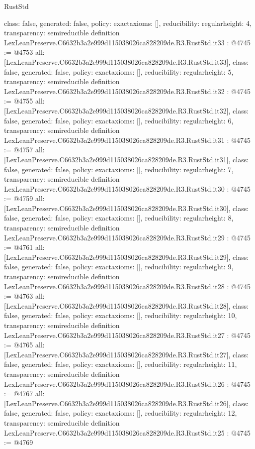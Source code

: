 \begin{lexlean}{RustStd}
\begin{coremodule}
{  class: false,
  generated: false,
  policy: exact{axioms: []},
  reducibility: regular{height: 4},
  transparency: semireducible
}
definition LexLeanPreserve.C6632b3a2e999d115038026ca828209de.R3.RustStd.it33 : @4745 := @4753 {
  all: [LexLeanPreserve.C6632b3a2e999d115038026ca828209de.R3.RustStd.it33],
  class: false,
  generated: false,
  policy: exact{axioms: []},
  reducibility: regular{height: 5},
  transparency: semireducible
}
definition LexLeanPreserve.C6632b3a2e999d115038026ca828209de.R3.RustStd.it32 : @4745 := @4755 {
  all: [LexLeanPreserve.C6632b3a2e999d115038026ca828209de.R3.RustStd.it32],
  class: false,
  generated: false,
  policy: exact{axioms: []},
  reducibility: regular{height: 6},
  transparency: semireducible
}
definition LexLeanPreserve.C6632b3a2e999d115038026ca828209de.R3.RustStd.it31 : @4745 := @4757 {
  all: [LexLeanPreserve.C6632b3a2e999d115038026ca828209de.R3.RustStd.it31],
  class: false,
  generated: false,
  policy: exact{axioms: []},
  reducibility: regular{height: 7},
  transparency: semireducible
}
definition LexLeanPreserve.C6632b3a2e999d115038026ca828209de.R3.RustStd.it30 : @4745 := @4759 {
  all: [LexLeanPreserve.C6632b3a2e999d115038026ca828209de.R3.RustStd.it30],
  class: false,
  generated: false,
  policy: exact{axioms: []},
  reducibility: regular{height: 8},
  transparency: semireducible
}
definition LexLeanPreserve.C6632b3a2e999d115038026ca828209de.R3.RustStd.it29 : @4745 := @4761 {
  all: [LexLeanPreserve.C6632b3a2e999d115038026ca828209de.R3.RustStd.it29],
  class: false,
  generated: false,
  policy: exact{axioms: []},
  reducibility: regular{height: 9},
  transparency: semireducible
}
definition LexLeanPreserve.C6632b3a2e999d115038026ca828209de.R3.RustStd.it28 : @4745 := @4763 {
  all: [LexLeanPreserve.C6632b3a2e999d115038026ca828209de.R3.RustStd.it28],
  class: false,
  generated: false,
  policy: exact{axioms: []},
  reducibility: regular{height: 10},
  transparency: semireducible
}
definition LexLeanPreserve.C6632b3a2e999d115038026ca828209de.R3.RustStd.it27 : @4745 := @4765 {
  all: [LexLeanPreserve.C6632b3a2e999d115038026ca828209de.R3.RustStd.it27],
  class: false,
  generated: false,
  policy: exact{axioms: []},
  reducibility: regular{height: 11},
  transparency: semireducible
}
definition LexLeanPreserve.C6632b3a2e999d115038026ca828209de.R3.RustStd.it26 : @4745 := @4767 {
  all: [LexLeanPreserve.C6632b3a2e999d115038026ca828209de.R3.RustStd.it26],
  class: false,
  generated: false,
  policy: exact{axioms: []},
  reducibility: regular{height: 12},
  transparency: semireducible
}
definition LexLeanPreserve.C6632b3a2e999d115038026ca828209de.R3.RustStd.it25 : @4745 := @4769 {
}
\end{coremodule}
\end{lexlean}
